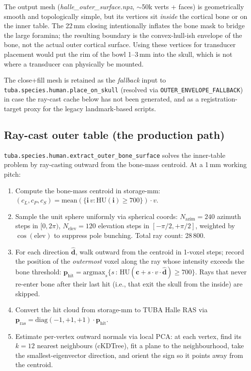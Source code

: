 \documentclass{compactarticle}
\begin{document}
The output mesh ({\em halle\_outer\_surface.npz}, $\sim$50k verts +
faces) is geometrically smooth and topologically simple, but its
vertices sit {\em inside} the cortical bone or on the inner table.
The 22\,mm closing intentionally inflates the bone mask to bridge the
large foramina; the resulting boundary is the convex-hull-ish envelope
of the bone, not the actual outer cortical surface. Using these
vertices for transducer placement would put the rim of the bowl 1--3\,mm
into the skull, which is not where a transducer can physically be
mounted.

The close+fill mesh is retained as the {\em fallback} input to
\texttt{tuba.species.human.\allowbreak place\_on\_skull} (resolved via
\texttt{OUTER\_ENVELOPE\_FALLBACK}) in case the ray-cast cache below
has not been generated, and as a registration-target proxy for the
legacy landmark-based scripts.

\subsection{Ray-cast outer table (the production path)}
\label{sec:surface_raycast}
\texttt{tuba.species.human.\allowbreak extract\_outer\_bone\_surface}
solves the inner-table problem by ray-casting outward from the
bone-mass centroid.
At a 1\,mm working pitch:

\begin{enumerate}
\item Compute the bone-mass centroid in storage-mm:
$(c_L, c_P, c_S) = \mathrm{mean}(\{\mathbf{i}\,v : \mathrm{HU}(\mathbf{i})\geq 700\})\cdot v$.
\item Sample the unit sphere uniformly via spherical coords:
$N_\mathrm{azim}=240$ azimuth steps in $[0, 2\pi)$, $N_\mathrm{elev}=120$
elevation steps in $[-\pi/2, +\pi/2]$, weighted by $\cos(\mathrm{elev})$
to suppress pole bunching. Total ray count: 28\,800.
\item For each direction $\mathbf{\hat d}$, walk outward from the
centroid in 1-voxel steps; record the position of the {\em outermost}
voxel along the ray whose intensity exceeds the bone threshold:
$\mathbf{p}_\mathrm{hit} = \mathrm{argmax}_{s} \{s \,:\,
\mathrm{HU}(\mathbf{c} + s\cdot v\cdot\mathbf{\hat d}) \geq 700\}$.
Rays that never re-enter bone after their last hit (i.e., that exit the
skull from the inside) are skipped.
\item Convert the hit cloud from storage-mm to TUBA Halle RAS via
$\mathbf{p}_\mathrm{ras} = \mathrm{diag}(-1,+1,+1)\cdot\mathbf{p}_\mathrm{hit}$.
\item Estimate per-vertex outward normals via local PCA: at each vertex,
find its $k=12$ nearest neighbours (cKDTree), fit a plane to the
neighbourhood, take the smallest-eigenvector direction, and orient the
sign so it points away from the centroid.
\end{enumerate}
\end{document}
